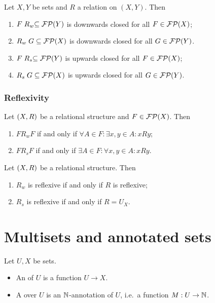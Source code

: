 \begin{proposition} \label{upDownClosureWeakStrongRelation}
Let $X,Y$ be sets and $R$ a relation on $(X,Y)$. Then
\begin{enumerate}
\item $F\mathrel{R_w} \subseteq \operatorname{\mathcal{FP}}(Y)$ is downwards closed for all $F\in\operatorname{\mathcal{FP}}(X)$;
\item $\mathrel{R_w}G  \subseteq \operatorname{\mathcal{FP}}(X)$ is downwards closed for all $G\in\operatorname{\mathcal{FP}}(Y)$.
\item $F\mathrel{R_s} \subseteq \operatorname{\mathcal{FP}}(Y)$ is upwards closed for all $F\in\operatorname{\mathcal{FP}}(X)$;
\item $\mathrel{R_s}G  \subseteq \operatorname{\mathcal{FP}}(X)$ is upwards closed for all $G\in\operatorname{\mathcal{FP}}(Y)$.
\end{enumerate}
\end{proposition}

\subsubsection{Reflexivity}
\begin{lemma}
Let $\sSet{X,R}$ be a relational structure and $F\in \operatorname{\mathcal{FP}}(X)$. Then
\begin{enumerate}
\item $F\mathrel{R_w}F$ \textup{if and only if} $\forall A\in F: \exists x,y\in A: xRy$;
\item $F\mathrel{R_s}F$ \textup{if and only if} $\exists A\in F: \forall x,y\in A: xRy$.
\end{enumerate}
\end{lemma}
\begin{corollary} \label{reflexivityFilterRelations}
Let $\sSet{X,R}$ be a relational structure. Then
\begin{enumerate}
\item $R_w$ is reflexive \textup{if and only if} $R$ is reflexive;
\item $R_s$ is reflexive \textup{if and only if} $R = U_X$.
\end{enumerate}
\end{corollary}


\section{Multisets and annotated sets}
\begin{definition}
Let $U, X$ be sets.
\begin{itemize}
\item An  of $U$ is a function $U\to X$.
\item A  over $U$ is an $\mathbb{N}$-annotation of $U$, i.e.\ a function $M: U\to \mathbb{N}$.
\end{itemize}
\end{definition}

